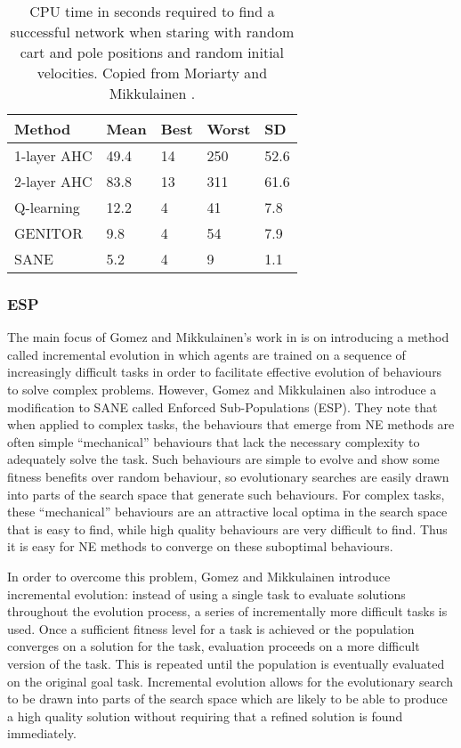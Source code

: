 \documentclass[12pt]{article} %
\begin{document}
\begin{table} \centering
    \begin{tabular}{|l|l|l|l|l|}
    \hline
    Method      & Mean & Best & Worst & SD   \\ \hline
    1-layer AHC & 49.4 & 14   & 250   & 52.6 \\ \hline
    2-layer AHC & 83.8 & 13   & 311   & 61.6 \\ \hline
    Q-learning  & 12.2 & 4    & 41    & 7.8  \\ \hline
    GENITOR     & 9.8  & 4    & 54    & 7.9  \\ \hline
    SANE        & 5.2  & 4    & 9     & 1.1  \\ \hline
    \end{tabular}
    \caption {CPU time in seconds required to find a successful network when staring with random cart and pole positions and random initial velocities. Copied from Moriarty and Mikkulainen \cite{Moriarty1996}.}
\end{table}

\subsubsection{ESP}

The main focus of Gomez and Mikkulainen's work in \cite{Gomez1997} is on introducing a method called incremental evolution in which agents are trained on a sequence of increasingly difficult tasks in order to facilitate effective evolution of behaviours to solve complex problems. However, Gomez and Mikkulainen also introduce a modification to SANE called Enforced Sub-Populations (ESP). They note that when applied to complex tasks, the behaviours that emerge from NE methods are often simple ``mechanical'' behaviours that lack the necessary complexity to adequately solve the task. Such behaviours are simple to evolve and show some fitness benefits over random behaviour, so evolutionary searches are easily drawn into parts of the search space that generate such behaviours. For complex tasks, these ``mechanical'' behaviours are an attractive local optima in the search space that is easy to find, while high quality behaviours are very difficult to find. Thus it is easy for NE methods to converge on these suboptimal behaviours.

In order to overcome this problem, Gomez and Mikkulainen introduce incremental evolution: instead of using a single task to evaluate solutions throughout the evolution process, a series of incrementally more difficult tasks is used. Once a sufficient fitness level for a task is achieved or the population converges on a solution for the task, evaluation proceeds on a more difficult version of the task. This is repeated until the population is eventually evaluated on the original goal task. Incremental evolution allows for the evolutionary search to be drawn into parts of the search space which are likely to be able to produce a high quality solution without requiring that a refined solution is found immediately.
\end{document}
